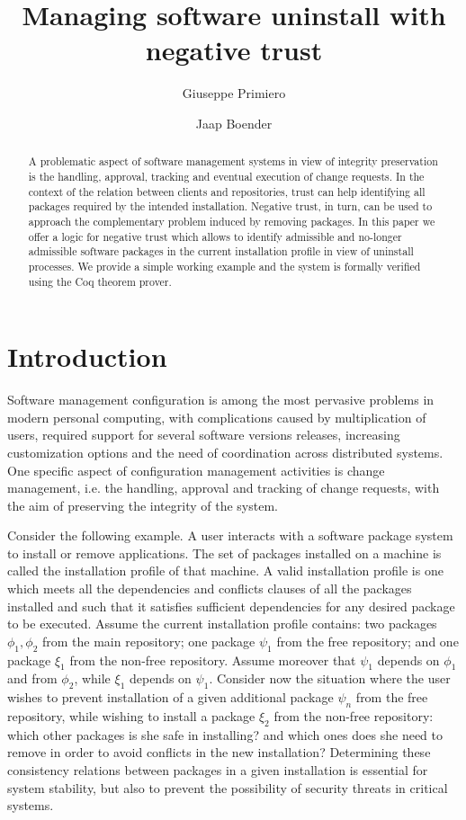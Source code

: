 \documentclass[]{llncs}
\title{Managing software uninstall with negative trust}
\author{Giuseppe Primiero \and Jaap Boender}
\institute{Department of Computer Science\\Middlesex University London\\United Kingdom}
\institute{Department of Computer Science\\ Middlesex University\\ United Kingdom\\ \email{G.Primiero@mdx.ac.uk\\J.Boender@mdx.ac.uk}}
\begin{document}
\maketitle

\begin{abstract}
A problematic aspect of software management systems in view of integrity preservation is the handling, approval, tracking and eventual execution of change requests. In the context of the relation between clients and repositories, trust can help identifying all packages required by the intended installation. Negative trust, in turn, can be used to approach the complementary problem induced by removing packages. In this paper we offer a logic for negative trust which allows to identify admissible and no-longer admissible software packages in the current installation profile in view of uninstall processes. We provide a simple working example and the system is formally verified using the Coq theorem prover.
\end{abstract}


\section{Introduction}\label{sec:intro}

Software management configuration is among the most pervasive problems in modern personal computing, with complications caused by multiplication of users, required support for several software versions releases, increasing customization options and the need of coordination across distributed systems. One specific aspect of configuration management activities is change management, i.e. the handling, approval and tracking of change requests, with the aim of preserving the integrity of the system.

Consider the following example. A user interacts with a software package system to install or remove applications. The set of packages installed on a machine is called the installation profile of that machine. A valid installation profile is one which meets all the dependencies and conflicts clauses of all the packages installed and such that it satisfies sufficient dependencies for any desired package to be executed. Assume the current installation profile contains: two packages $\phi_{1},\phi_{2}$ from the main repository; one package $\psi_{1}$ from the free repository; and one package $\xi_{1}$ from the non-free repository. Assume moreover that $\psi_{1}$ depends on $\phi_{1}$ and from $\phi_{2}$, while $\xi_{1}$ depends on $\psi_{1}$. Consider now the situation where the user wishes to prevent installation of a given additional package $\psi_{n}$ from the free repository, while wishing to install a package $\xi_{2}$ from the non-free repository: which other packages is she safe in installing? and which ones does she need to remove in order to avoid conflicts in the new installation? Determining these consistency relations between packages in a given installation is essential for system stability, but also to prevent the possibility of security threats in critical systems.
\end{document}
